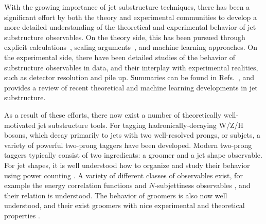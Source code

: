 \documentclass[11pt,letterpaper]{article}
\DeclareRobustCommand{\Refs}[1]{Refs.~\cite{#1}}
\begin{document}
With the growing importance of jet substructure techniques, there has been a significant effort by both the theory and experimental communities to develop a more detailed understanding of the theoretical and experimental behavior of jet substructure observables.
%
On the theory side, this has been pursued through explicit calculations~\cite{Feige:2012vc,Field:2012rw,Dasgupta:2013ihk,Dasgupta:2013via,Larkoski:2014pca,Dasgupta:2015yua,Seymour:1997kj,Li:2011hy,Larkoski:2012eh,Jankowiak:2012na,Chien:2014nsa,Chien:2014zna,Isaacson:2015fra,Krohn:2012fg,Waalewijn:2012sv,Larkoski:2014tva,Procura:2014cba,Bertolini:2015pka,Bhattacherjee:2015psa,Larkoski:2015kga,Dasgupta:2015lxh,Frye:2016okc,Frye:2016aiz,Kang:2016ehg,Hornig:2016ahz,Marzani:2017mva}, scaling arguments~\cite{Walsh:2011fz,Larkoski:2014gra,Larkoski:2014zma}, and machine learning \cite{Cogan:2014oua,deOliveira:2015xxd,Almeida:2015jua,Baldi:2016fql,Guest:2016iqz,Conway:2016caq,Barnard:2016qma} approaches.
%
On the experimental side, there have been detailed studies of the behavior of substructure observables in data, and their interplay with experimental realities, such as detector resolution and pile up.
%
Summaries can be found in \Refs{Abdesselam:2010pt,Altheimer:2012mn,Altheimer:2013yza,Adams:2015hiv}, and \cite{Larkoski:2017jix} provides a review of recent theoretical and machine learning developments in jet substructure. 

As a result of these efforts, there now exist a number of theoretically well-motivated jet substructure tools.
%
For tagging hadronically-decaying W/Z/H bosons, which decay primarily to jets with two well-resolved prongs, or subjets, a variety of powerful two-prong taggers have been developed.
%
Modern two-prong taggers typically consist of two ingredients: a groomer and a jet shape observable.
%
For jet shapes, it is well understood how to organize and study their
behavior using power counting \cite{Larkoski:2014gra}.
%
A variety of
different classes of observables exist, for example the energy
correlation functions \cite{Larkoski:2013eya} and $N$-subjettiness
observables \cite{Thaler:2010tr,Thaler:2011gf}, and their relation is
understood.
%
The behavior of groomers is also now well understood, and
their exist groomers with nice experimental and theoretical properties
\cite{Dasgupta:2013ihk,Larkoski:2014wba}.
\end{document}
